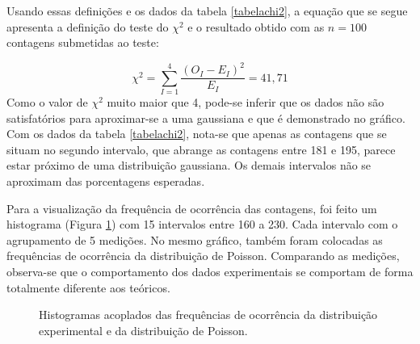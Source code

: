 \documentclass{article}
\begin{document}
Usando essas definições e os dados da tabela \ref{tabelachi2}, a equação que se segue apresenta a definição do teste do $\chi ^2$ e o resultado obtido com as $n= 100$ contagens submetidas ao teste:

\begin{equation}
    \chi ^2 = \sum _{I=1} ^{4} \frac{(O _I - E_I)^2}{E _I} = 41,71
\end{equation}Como o valor de $\chi ^2$  muito maior que 4, pode-se inferir que os dados não são satisfatórios para aproximar-se a uma gaussiana e que é demonstrado no gráfico. Com os dados da tabela \ref{tabelachi2}, nota-se que apenas as contagens que se situam no segundo intervalo, que abrange as contagens entre 181 e 195, parece estar próximo de uma distribuição gaussiana. Os demais intervalos não se aproximam das porcentagens esperadas.

Para a visualização da frequência de ocorrência das contagens, foi feito um histograma (Figura \ref{grafico_poisson}) com 15 intervalos entre 160 a 230. Cada intervalo com o agrupamento de 5 medições. No mesmo gráfico, também foram colocadas as frequências de ocorrência da distribuição de Poisson. Comparando as medições, observa-se que o comportamento dos dados experimentais se comportam de forma totalmente diferente aos teóricos.

\begin{figure}[H] %
    \centering
    \caption{Histogramas acoplados das frequências de ocorrência da distribuição experimental e da distribuição de Poisson.}
    \label{grafico_poisson}
\end{figure}
\end{document}
